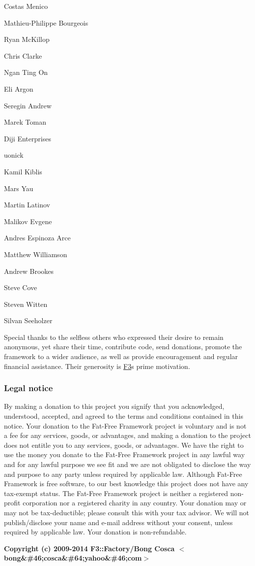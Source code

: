 \begin{DoxyItemize}
\item Costas Menico
\item Mathieu-\/\+Philippe Bourgeois
\item Ryan Mc\+Killop
\item Chris Clarke
\item Ngan Ting On
\item Eli Argon
\item Seregin Andrew
\item Marek Toman
\item Diji Enterprises
\item uonick
\item Kamil Kiblis
\item Mars Yau
\item Martin Latinov
\item Malikov Evgene
\item Andres Espinoza Arce
\item Matthew Williamson
\item Andrew Brookes
\item Steve Cove
\item Steven Witten
\item Silvan Seeholzer
\end{DoxyItemize}

Special thanks to the selfless others who expressed their desire to remain anonymous, yet share their time, contribute code, send donations, promote the framework to a wider audience, as well as provide encouragement and regular financial assistance. Their generosity is \hyperlink{class_f3}{F3}\textquotesingle{}s prime motivation.

\href{https://www.paypal.com/cgi-bin/webscr?cmd=_s-xclick&hosted_button_id=MJSQL8N5LPDAY}{\tt }



\subsubsection*{Legal notice}

By making a donation to this project you signify that you acknowledged, understood, accepted, and agreed to the terms and conditions contained in this notice. Your donation to the Fat-\/\+Free Framework project is voluntary and is not a fee for any services, goods, or advantages, and making a donation to the project does not entitle you to any services, goods, or advantages. We have the right to use the money you donate to the Fat-\/\+Free Framework project in any lawful way and for any lawful purpose we see fit and we are not obligated to disclose the way and purpose to any party unless required by applicable law. Although Fat-\/\+Free Framework is free software, to our best knowledge this project does not have any tax-\/exempt status. The Fat-\/\+Free Framework project is neither a registered non-\/profit corporation nor a registered charity in any country. Your donation may or may not be tax-\/deductible; please consult this with your tax advisor. We will not publish/disclose your name and e-\/mail address without your consent, unless required by applicable law. Your donation is non-\/refundable.

{\bfseries Copyright (c) 2009-\/2014 F3\+::\+Factory/\+Bong Cosca $<$bong\&\#46;cosca\&\#64;yahoo\&\#46;com$>$}

\href{http://githalytics.com/bcosca/fatfree}{\tt } 